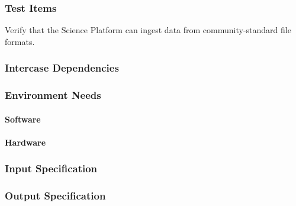 \subsubsection{Test Items}
Verify that the Science Platform can ingest data from community-standard
file formats.



\subsubsection{Intercase Dependencies}

\subsubsection{Environment Needs}

\paragraph{Software}

\paragraph{Hardware}

\subsubsection{Input Specification}

\subsubsection{Output Specification}


